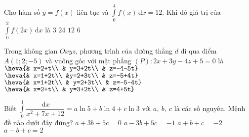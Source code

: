 \begin{ex}%
Cho hàm số $y=f(x)$ liên tục và $\displaystyle\int\limits_{0}^{4}f(x)\mathrm{\,d} x=12$. Khi đó giá trị của $\displaystyle\int\limits_{0}^{2}f(2x)\mathrm{\,d} x$ là
\choice
{$3$}
{$24$}
{$12$}
{\True $6$}
\end{ex}


\begin{ex}%
Trong không gian $Oxyz$, phương trình của đường thẳng $d$ đi qua điểm $A(1;2;-5)$ và vuông góc với mặt phẳng $(P)\colon 2x+3y-4z+5=0$ là
\choice
{$\heva{& x=2+t\\ & y=3+2t\\ & z=-4-5t}$}
{$\heva{& x=1+2t\\ &y=2+3t\\ & z=-5+4t}$}
{\True $\heva{& x=1+2t\\ & y=2+3t\\ & z=-5-4t}$}
{$\heva{& x=2+t\\ & y=3+2t\\ & z=4+5t}$}
\end{ex}


\begin{ex}%
Biết $\displaystyle\int\limits_{0}^{1}\dfrac{\mathrm{\,d} x}{x^2+7x+12}=a\ln 5+b\ln 4+c\ln 3$ với $a,\ b,\ c$ là các số nguyên. Mệnh đề nào dưới đây đúng?
\choice
{\True $a+3b+5c=0$}
{$a-3b+5c=-1$}
{$a+b+c=-2$}
{$a-b+c=2$}
\end{ex}


